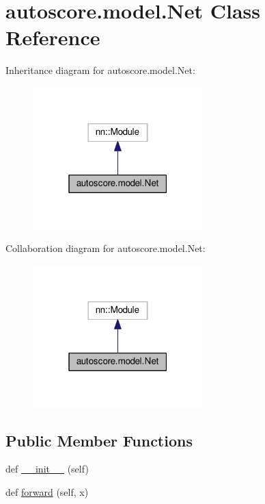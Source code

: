 \hypertarget{classautoscore_1_1model_1_1Net}{}\section{autoscore.\+model.\+Net Class Reference}
\label{classautoscore_1_1model_1_1Net}


Inheritance diagram for autoscore.\+model.\+Net\+:\nopagebreak
\begin{figure}[H]
\begin{center}
\leavevmode
\includegraphics[width=187pt]{classautoscore_1_1model_1_1Net__inherit__graph}
\end{center}
\end{figure}


Collaboration diagram for autoscore.\+model.\+Net\+:\nopagebreak
\begin{figure}[H]
\begin{center}
\leavevmode
\includegraphics[width=187pt]{classautoscore_1_1model_1_1Net__coll__graph}
\end{center}
\end{figure}
\subsection*{Public Member Functions}
\begin{DoxyCompactItemize}
\item 
def \hyperlink{classautoscore_1_1model_1_1Net_a25b2d2e182c0444ef17ac2528a9395d8}{\+\_\+\+\_\+init\+\_\+\+\_\+} (self)
\item 
def \hyperlink{classautoscore_1_1model_1_1Net_a21c71ff3dd5f3fbbc0c3f5a28500ac41}{forward} (self, x)
\end{DoxyCompactItemize}
